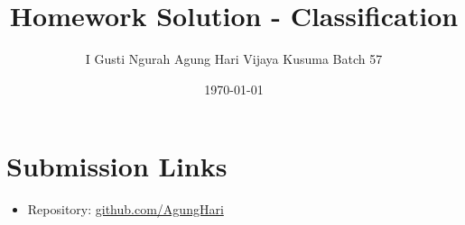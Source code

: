\documentclass[12pt]{article}
\title{Homework Solution - Classification}
\author{I Gusti Ngurah Agung Hari Vijaya Kusuma Batch 57}
\date{\today}
\begin{document}
\maketitle

\section*{Submission Links}
\begin{itemize}
  \item Repository: \href{https://github.com/AgungHari/Rakamin_HW_MachineLearning_SupervisedLearning}{github.com/AgungHari}
\end{itemize}






\end{document}

